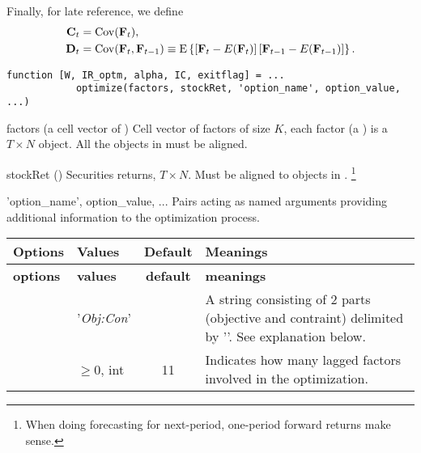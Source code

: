 Finally, for late reference, we define
\begin{align*}
    \mathbf{C}_t &= \operatorname{Cov}(\mathbf{F}_t),\\
    \mathbf{D}_t &= \operatorname{Cov}(\mathbf{F}_t,\mathbf{F}_{t-1}) \equiv \operatorname{E}\left\{\left[\mathbf{F}_t-E(\mathbf{F}_t)\right]\left[\mathbf{F}_{t-1}-E(\mathbf{F}_{t-1})\right]\right\}.
\end{align*}

\usage
   \begin{lstlisting}[numbers=none]
   function [W, IR_optm, alpha, IC, exitflag] = ...
            optimize(factors, stockRet, 'option_name', option_value, ...)
   \end{lstlisting}

\inarg
  \begin{argdesc}
	\item[factors]  (a cell vector of \myfints{}) Cell vector of factors of size $K$,
                   each factor (a \myfints{}) is a $T\times N$ \myfints{} object.
                   All the \myfints{} objects in  must be aligned.
   \item[stockRet] (\myfints{}) Securities returns, $T\times N$. 
                   Must be aligned to \myfints{} objects in .
                   \footnote{When doing forecasting for next-period, one-period forward returns make sense.}
	\item['option\_name', option\_value, ...] Pairs acting as named arguments providing additional information to the optimization process. 
	   \begin{longtable}[r]{>{\ttfamily}l<{} p{1.5cm} c p{9.5cm}}
   	      \textsf{\textbf{Options}} & \textsf{\textbf{Values}} & \textsf{\textbf{Default}} & \textsf{\textbf{Meanings}} \\
		      \toprule
		      \endfirsthead
   	      \textsf{\textbf{options}} & \textsf{\textbf{values}} & \textsf{\textbf{default}} & \textsf{\textbf{meanings}} \\
		      \toprule
		      \endhead
		      \bottomrule
		      \endfoot
		      \bottomrule
		      \endlastfoot
             \rowcolor{cone}
	          \mcode{method} & '\textit{Obj:Con}' & \mcode{'M/V:RHO'} &
                    A string consisting of 2 parts (objective and contraint) delimited by '\mcode{:}'. 
                    See explanation below. \\
             \rowcolor{ctwo}
		       \mcode{lag} & $\geq 0$, int & 11 & 
                    Indicates how many lagged factors involved in the optimization.

\end{longtable}
\end{argdesc}
